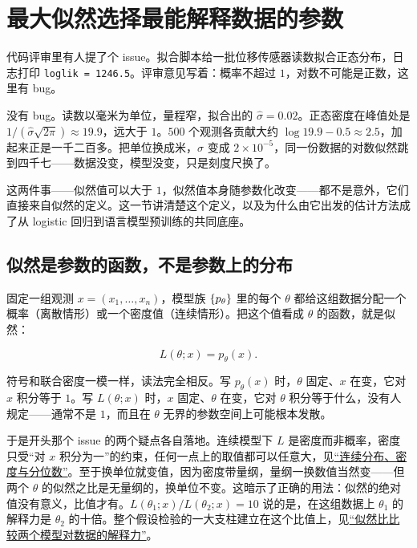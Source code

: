 \section{最大似然选择最能解释数据的参数}
\label{sec:11-Mathematical-Statistics/02-Point-Estimation/03}

代码评审里有人提了个 issue。拟合脚本给一批位移传感器读数拟合正态分布，日志打印 \texttt{loglik = 1246.5}。评审意见写着：概率不超过 \(1\)，对数不可能是正数，这里有 bug。

没有 bug。读数以毫米为单位，量程窄，拟合出的 \(\hat\sigma=0.02\)。正态密度在峰值处是 \(1/(\hat\sigma\sqrt{2\pi})\approx 19.9\)，远大于 \(1\)。\(500\) 个观测各贡献大约 \(\log 19.9-0.5\approx 2.5\)，加起来正是一千二百多。把单位换成米，\(\hat\sigma\) 变成 \(2\times 10^{-5}\)，同一份数据的对数似然跳到四千七——数据没变，模型没变，只是刻度尺换了。

这两件事——似然值可以大于 \(1\)，似然值本身随参数化改变——都不是意外，它们直接来自似然的定义。这一节讲清楚这个定义，以及为什么由它出发的估计方法成了从 logistic 回归到语言模型预训练的共同底座。

\subsection{似然是参数的函数，不是参数上的分布}

固定一组观测 \(x=(x_1,\dots,x_n)\)，模型族 \(\left\{p_\theta\right\}\) 里的每个 \(\theta\) 都给这组数据分配一个概率（离散情形）或一个密度值（连续情形）。把这个值看成 \(\theta\) 的函数，就是似然：

\[
L(\theta;x)=p_\theta(x).
\]

符号和联合密度一模一样，读法完全相反。写 \(p_\theta(x)\) 时，\(\theta\) 固定、\(x\) 在变，它对 \(x\) 积分等于 \(1\)。写 \(L(\theta;x)\) 时，\(x\) 固定、\(\theta\) 在变，它对 \(\theta\) 积分等于什么，没有人规定——通常不是 \(1\)，而且在 \(\theta\) 无界的参数空间上可能根本发散。

于是开头那个 issue 的两个疑点各自落地。连续模型下 \(L\) 是密度而非概率，密度只受``对 \(x\) 积分为一''的约束，任何一点上的取值都可以任意大，见\hyperref[sec:05-Probability/03-Random-Variables/03]{``连续分布、密度与分位数''}。至于换单位就变值，因为密度带量纲，量纲一换数值当然变——但两个 \(\theta\) 的似然之比是无量纲的，换单位不变。这暗示了正确的用法：似然的绝对值没有意义，比值才有。\(L(\theta_1;x)/L(\theta_2;x)=10\) 说的是，在这组数据上 \(\theta_1\) 的解释力是 \(\theta_2\) 的十倍。整个假设检验的一大支柱建立在这个比值上，见\hyperref[sec:11-Mathematical-Statistics/05-Hypothesis-Testing/03]{``似然比比较两个模型对数据的解释力''}。

